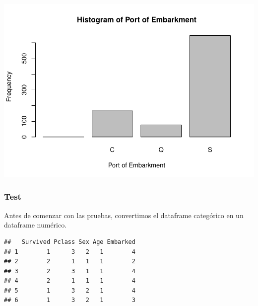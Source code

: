 \documentclass[]{article}
\newenvironment{Shaded}{\begin{snugshade}}{\end{snugshade}}
\newcommand{\KeywordTok}[1]{\textcolor[rgb]{0.13,0.29,0.53}{\textbf{#1}}}
\newcommand{\StringTok}[1]{\textcolor[rgb]{0.31,0.60,0.02}{#1}}
\newcommand{\OperatorTok}[1]{\textcolor[rgb]{0.81,0.36,0.00}{\textbf{#1}}}
\newcommand{\NormalTok}[1]{#1}
\begin{document}
\includegraphics{titanicDataClean_files/figure-latex/unnamed-chunk-11-4.pdf}

\subsubsection{Test}\label{test}

Antes de comenzar con las pruebas, convertimos el dataframe categórico
en un dataframe numérico.

\begin{Shaded}
\end{Shaded}

\begin{verbatim}
##   Survived Pclass Sex Age Embarked
## 1        1      3   2   1        4
## 2        2      1   1   1        2
## 3        2      3   1   1        4
## 4        2      1   1   1        4
## 5        1      3   2   1        4
## 6        1      3   2   1        3
\end{verbatim}
\end{document}
